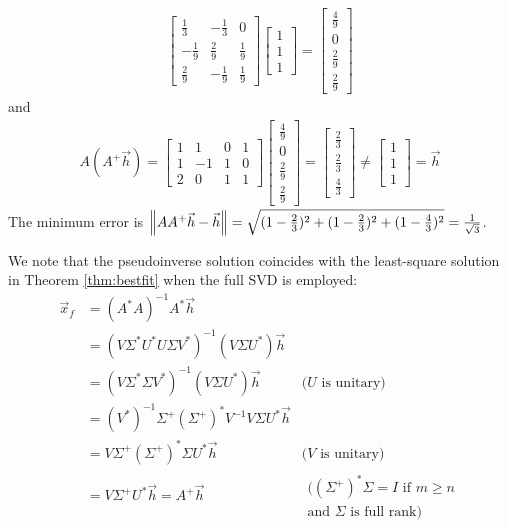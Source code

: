 \begin{solution}
\begin{align*}
\begin{bmatrix}
\frac{1}{3}&-\frac{1}{3}&0\\ 
-\frac{1}{9}&\frac{2}{9}&\frac{1}{9}\\ 
\frac{2}{9}&-\frac{1}{9}&\frac{1}{9}
\end{bmatrix}
\begin{bmatrix}
1 \\
1 \\
1
\end{bmatrix}  
=
\begin{bmatrix}
\frac{4}{9}\\ 
0\\ 
\frac{2}{9}\\ 
\frac{2}{9}
\end{bmatrix}
\end{align*}
and
\begin{align*}
A(A^+\vec{h}) = 
\begin{bmatrix}
1&1&0&1\\ 
1&-1&1&0\\ 
2&0&1&1
\end{bmatrix}
\begin{bmatrix}
\frac{4}{9}\\ 
0\\ 
\frac{2}{9}\\ 
\frac{2}{9}
\end{bmatrix}
=
\begin{bmatrix}
\frac{2}{3} \\
\frac{2}{3} \\
\frac{4}{3}
\end{bmatrix}
\neq 
\begin{bmatrix}
1 \\
1 \\
1
\end{bmatrix} 
= \vec{h}
\end{align*}
The minimum error is $\norm{AA^+\vec{h} - \vec{h}} = \sqrt{(1-\frac{2}{3})^2 + (1-\frac{2}{3})^2 + (1-\frac{4}{3})^2} = \frac{1}{\sqrt{3}}$.
\end{solution}
We note that the pseudoinverse solution coincides with the least-square solution in Theorem \ref{thm:bestfit} when the full SVD is employed:
\begin{align*}
\vec{x}_f &= (A^* A)^{-1}A^* \vec{h} \\
&= (V \Sigma^* U^* U\Sigma V^*)^{-1} (V \Sigma U^*) \vec{h} \\
&= (V \Sigma^* \Sigma V^*)^{-1} (V \Sigma U^*) \vec{h} & \text{($U$ is unitary)} \\
&= (V^*)^{-1} \Sigma^+ (\Sigma^+)^* V^{-1} V \Sigma U^* \vec{h} \\
&= V \Sigma^+ (\Sigma^+)^* \Sigma U^* \vec{h} & \text{($V$ is unitary)} \\
&= V {\Sigma^+} U^* \vec{h} = A^+\vec{h} & 
\begin{aligned}
\text{($(\Sigma^+)^* \Sigma = I$ if $m \geq n$} \\ \text{and $\Sigma$ is full rank)} 
\end{aligned}
\end{align*}
